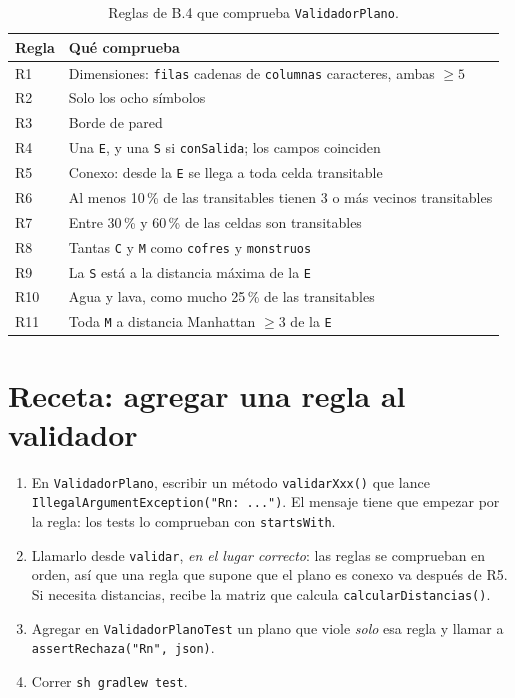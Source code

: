 \documentclass[11pt,a4paper]{article}
\begin{document}
\begin{table}[h]
\centering
\begin{tabularx}{\textwidth}{lX}
\toprule
Regla & Qu\'e comprueba \\
\midrule
R1 & Dimensiones: \texttt{filas} cadenas de \texttt{columnas} caracteres, ambas $\geq 5$ \\
R2 & Solo los ocho s\'imbolos \\
R3 & Borde de pared \\
R4 & Una \texttt{E}, y una \texttt{S} si \texttt{conSalida}; los campos coinciden \\
R5 & Conexo: desde la \texttt{E} se llega a toda celda transitable \\
R6 & Al menos 10\,\% de las transitables tienen 3 o m\'as vecinos transitables \\
R7 & Entre 30\,\% y 60\,\% de las celdas son transitables \\
R8 & Tantas \texttt{C} y \texttt{M} como \texttt{cofres} y \texttt{monstruos} \\
R9 & La \texttt{S} est\'a a la distancia m\'axima de la \texttt{E} \\
R10 & Agua y lava, como mucho 25\,\% de las transitables \\
R11 & Toda \texttt{M} a distancia Manhattan $\geq 3$ de la \texttt{E} \\
\bottomrule
\end{tabularx}
\caption{Reglas de B.4 que comprueba \texttt{ValidadorPlano}.}
\end{table}

\section{Receta: agregar una regla al validador}

\begin{enumerate}
  \item En \texttt{ValidadorPlano}, escribir un m\'etodo
        \texttt{validarXxx()} que lance
        \texttt{IllegalArgumentException("Rn: ...")}. El mensaje tiene que
        empezar por la regla: los tests lo comprueban con \texttt{startsWith}.
  \item Llamarlo desde \texttt{validar}, \emph{en el lugar correcto}: las reglas
        se comprueban en orden, as\'i que una regla que supone que el plano es
        conexo va despu\'es de R5. Si necesita distancias, recibe la matriz que
        calcula \texttt{calcularDistancias()}.
  \item Agregar en \texttt{ValidadorPlanoTest} un plano que viole \emph{solo}
        esa regla y llamar a \texttt{assertRechaza("Rn", json)}.
  \item Correr \texttt{sh gradlew test}.
\end{enumerate}
\end{document}

